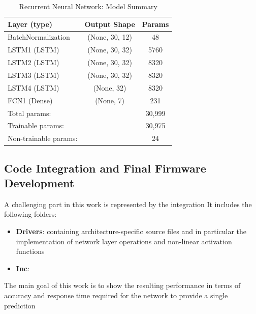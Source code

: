 \newcommand\T{\rule{0pt}{2.6ex}}       %
\newcommand\B{\rule[-1.2ex]{0pt}{0pt}} %

\begin{table}[H]
	\begin{tabular}{||p{5cm}cc||}
		\hline
		Layer (type)      &           Output Shape        &      Params \T\B	\\
		\hline
		\hline
		BatchNormalization    &		  (None, 30, 12)       &     48          \T\B \\
		\hline
		LSTM1 (LSTM)          &       (None, 30, 32)       &     5760      	\T\B \\
		\hline
		LSTM2 (LSTM)          &       (None, 30, 32)       &     8320       \T\B \\
		\hline
		LSTM3 (LSTM)          &       (None, 30, 32)       &     8320      	\T\B \\
		\hline
		LSTM4 (LSTM)          &       (None, 32)           &     8320       \T\B \\ 
		\hline
		FCN1 (Dense)         &        (None, 7)            &     231      	\T\B \\ 
		\hline
		\hline
		Total params:   &&										30,999\T  \\
		Trainable params:  && 	  								30,975\\
		Non-trainable params:  && 								24\B  \\
		\hline
		
	\end{tabular}
	\centering
	\caption{\label{tab:1}Recurrent Neural Network: Model Summary}
\end{table}

\subsection{Code Integration and Final Firmware Development}
 A challenging part in this work is represented by the integration  It includes the following folders:
\begin{itemize}
	\item \textbf{Drivers}: containing architecture-specific source files and in particular the implementation of network layer operations and non-linear activation functions
	\item \textbf{Inc}:  
\end{itemize} 



The main goal of this work is to show the resulting performance in terms of accuracy and response time required for the network to provide a single prediction


